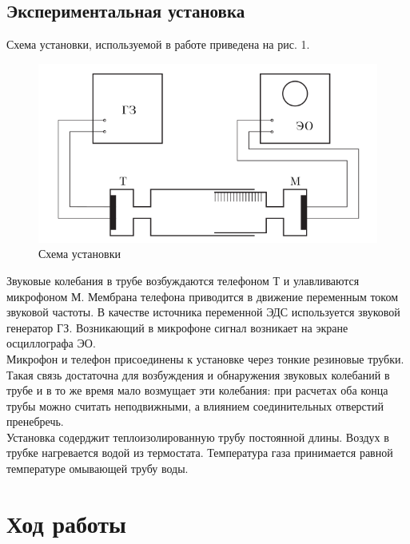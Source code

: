 \documentclass[12pt]{article}
\begin{document}
\subsection*{Экспериментальная установка} Схема установки, используемой в работе
приведена на рис. 1.\\ 
\begin{figure}[H] 
\centering
\includegraphics[scale=2]{stand.png} 
\caption{Схема установки}
\end{figure} 
Звуковые колебания в трубе возбуждаются телефоном Т и улавливаются
микрофоном М. Мембрана телефона приводится в движение переменным током звуковой
частоты.  В качестве источника переменной ЭДС используется звуковой генератор
ГЗ. Возникающий в микрофоне сигнал возникает на экране осциллографа ЭО. \\
Микрофон и телефон присоединены к установке через тонкие резиновые трубки. Такая
связь достаточна для возбуждения и обнаружения звуковых колебаний в трубе и в то
же время мало возмущает эти колебания: при расчетах оба конца трубы можно
считать неподвижными, а влиянием соединительных отверстий пренебречь. \\
Установка содерджит теплоизолированную трубу постоянной длины. Воздух в трубке
нагревается водой из термостата. Температура газа принимается равной температуре
омывающей трубу воды. 

\section{Ход работы}
\end{document}
